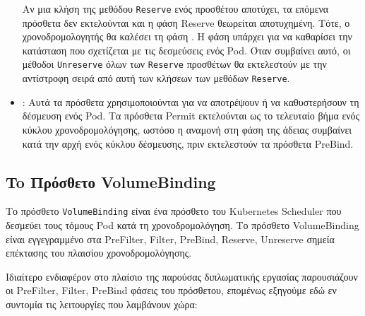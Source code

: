 \begin{itemize}
            Αν μια κλήση της μεθόδου \texttt{Reserve} ενός προσθέτου αποτύχει,
            τα επόμενα πρόσθετα δεν εκτελούνται και η φάση Reserve θεωρείται
            αποτυχημένη. Τότε, ο χρονοδρομολογητής θα καλέσει τη φάση
            . Η    φάση υπάρχει για να καθαρίσει την
            κατάσταση που σχετίζεται με τις δεσμεύσεις ενός Pod. Όταν συμβαίνει
            αυτό, οι μέθοδοι \texttt{Unreserve} όλων των \texttt{Reserve}
            προσθέτων θα εκτελεστούν με την αντίστροφη σειρά από αυτή των
            κλήσεων των μεθόδων \texttt{Reserve}.
            
      \item
            \textbf{}: Αυτά τα πρόσθετα χρησιμοποιούνται για να
            αποτρέψουν ή να καθυστερήσουν τη δέσμευση ενός Pod. Τα πρόσθετα
            Permit εκτελούνται ως το τελευταίο βήμα ενός κύκλου
            χρονοδρομολόγησης, ωστόσο η αναμονή στη φάση της άδειας συμβαίνει
            κατά την αρχή ενός κύκλου δέσμευσης, πριν εκτελεστούν τα πρόσθετα
            PreBind.
\end{itemize}


\subsection{To Πρόσθετο VolumeBinding}


Το πρόσθετο \texttt{VolumeBinding} είναι ένα πρόσθετο του Kubernetes Scheduler
που δεσμεύει τους τόμους Pod κατά τη χρονοδρομολόγηση. Το πρόσθετο VolumeBinding
είναι εγγεγραμμένο στα PreFilter, Filter, PreBind, Reserve, Unreserve σημεία
επέκτασης του πλαισίου χρονοδρομολόγησης.

Ιδιαίτερο ενδιαφέρον στο πλαίσιο της παρούσας διπλωματικής εργασίας παρουσιάζουν
οι PreFilter, Filter, PreBind φάσεις του πρόσθετου, επομένως εξηγούμε εδώ εν
συντομία τις λειτουργίες που λαμβάνουν χώρα:

